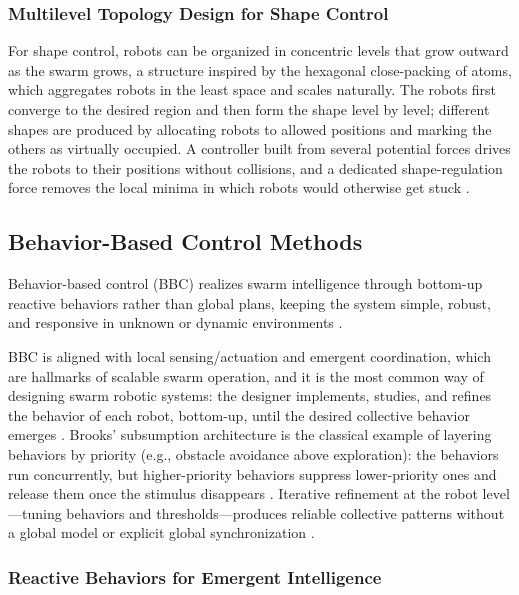 \subsubsection{Multilevel Topology Design for Shape Control}

For shape control, robots can be organized in concentric levels that grow
outward as the swarm grows, a structure inspired by the hexagonal close-packing
of atoms, which aggregates robots in the least space and scales naturally. The
robots first converge to the desired region and then form the shape level by
level; different shapes are produced by allocating robots to allowed positions
and marking the others as virtually occupied. A controller built from several
potential forces drives the robots to their positions without collisions, and a
dedicated shape-regulation force removes the local minima in which robots would
otherwise get stuck \cite{tan2016handbook}.

\subsection{Behavior-Based Control Methods}

Behavior-based control (BBC) realizes swarm intelligence through bottom-up
reactive behaviors rather than global plans, keeping the system simple, robust,
and responsive in unknown or dynamic environments \cite{hamann2018swarm}.

BBC is aligned with local sensing/actuation and emergent coordination, which are
hallmarks of scalable swarm operation, and it is the most common way of
designing swarm robotic systems: the designer implements, studies, and refines
the behavior of each robot, bottom-up, until the desired collective behavior
emerges \cite{brambilla2013swarm}. Brooks' subsumption architecture is the
classical example of layering behaviors by priority (e.g., obstacle avoidance
above exploration): the behaviors run concurrently, but higher-priority behaviors
suppress lower-priority ones and release them once the stimulus disappears
\cite{brooks1986robust}. Iterative refinement at the robot level---tuning
behaviors and thresholds---produces reliable collective patterns without a global
model or explicit global synchronization \cite{nguyen2024swarm}.

\subsubsection{Reactive Behaviors for Emergent Intelligence}


